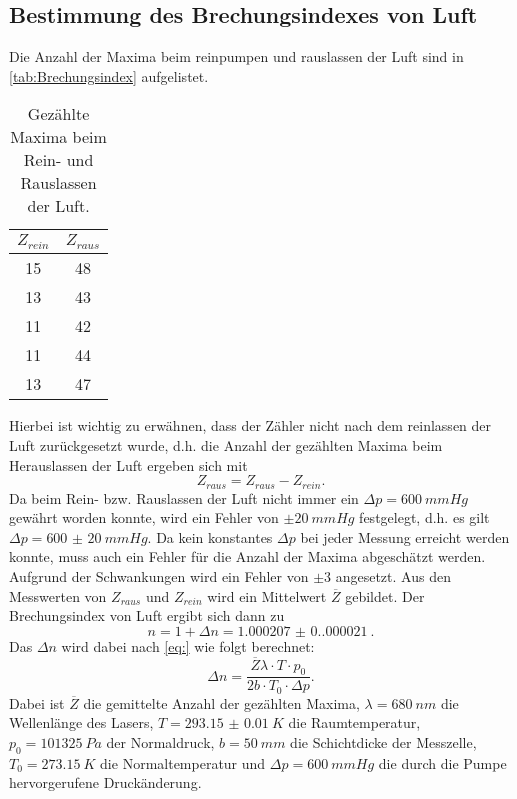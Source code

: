 \subsection{Bestimmung des Brechungsindexes von Luft}
Die Anzahl der Maxima beim reinpumpen und rauslassen der Luft sind in \autoref{tab:Brechungsindex} aufgelistet.
\begin{table}[H]
  \centering
  \caption{Gezählte Maxima beim Rein- und Rauslassen der Luft.}
  \begin{tabular}{c c}
      \toprule
      $Z_{rein}$ & $Z_{raus}$\\
      \midrule
      15 & 48\\
      13 & 43\\
      11 & 42\\
      11 & 44\\
      13 & 47\\
      \bottomrule
  \end{tabular}
  \label{tab:wellenleange}
\end{table}
Hierbei ist wichtig zu erwähnen, dass der Zähler nicht nach dem reinlassen der Luft zurückgesetzt wurde, d.h. die Anzahl der gezählten Maxima beim Herauslassen der Luft
ergeben sich mit
\begin{equation*}
  Z_{raus} = Z_{raus} - Z_{rein}.
\end{equation*}
Da beim Rein- bzw. Rauslassen der Luft nicht immer ein $\Delta p = \SI{600}{mmHg}$ gewährt worden konnte, wird ein Fehler von $\pm \SI{20}{mmHg}$ festgelegt, d.h. es gilt 
$\Delta p = \SI{600(20)}{mmHg}$.
Da kein konstantes $\Delta p$ bei jeder Messung erreicht werden konnte, muss auch ein Fehler für die Anzahl der Maxima abgeschätzt werden. Aufgrund der Schwankungen
wird ein Fehler von $\pm 3$ angesetzt.
Aus den Messwerten von $Z_{raus}$ und $Z_{rein}$ wird ein Mittelwert $\overline{Z}$ gebildet. Der Brechungsindex von Luft ergibt sich dann zu
\begin{equation*}
  n = 1 + \Delta n = \SI{1.000207(0.000021)}{}.
\end{equation*}
Das $\Delta n$ wird dabei nach \autoref{eq:} wie folgt berechnet:
\begin{equation*}
  \Delta n = \frac{\overline{Z}\lambda \cdot T \cdot p_0}{2b \cdot T_0 \cdot \Delta p}.
\end{equation*}
Dabei ist $\overline{Z}$ die gemittelte Anzahl der gezählten Maxima, $\lambda = \SI{680}{nm}$ die Wellenlänge des Lasers, $T = \SI{293.15(1)}{K}$ die Raumtemperatur,
$p_0 = \SI{101325}{Pa}$ \cite{p_normal} der Normaldruck, $b = \SI{50}{mm}$ die Schichtdicke der Messzelle, $T_0 = \SI{273.15}{K}$ die Normaltemperatur und $\Delta p = \SI{600}{mmHg}$
die durch die Pumpe hervorgerufene Druckänderung.
